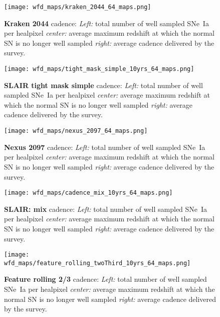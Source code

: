 \begin{figure}[!htbp]
  \begin{center}
    \texttt{[image: wfd\_maps/kraken\_2044\_64\_maps.png]}
    \caption{{\bf Kraken 2044} cadence: {\em Left:} total number of well
      sampled SNe~Ia per healpixel {\em center:} average maximum
      redshift at which the normal SN is no longer well sampled {\em
        right:} average cadence delivered by the survey.}
    \label{fig:kraken_2044}
  \end{center}
\end{figure}

\begin{figure}[!htbp]
  \begin{center}
    \texttt{[image: wfd\_maps/tight\_mask\_simple\_10yrs\_64\_maps.png]}
    \caption{{\bf SLAIR tight mask simple} cadence: {\em Left:} total number of well
      sampled SNe~Ia per healpixel {\em center:} average maximum
      redshift at which the normal SN is no longer well sampled {\em
        right:} average cadence delivered by the survey.}
    \label{fig:tight_mask_simple}
  \end{center}
\end{figure}

\begin{figure}[!htbp]
  \begin{center}
    \texttt{[image: wfd\_maps/nexus\_2097\_64\_maps.png]}
    \caption{{\bf Nexus 2097} cadence: {\em Left:} total number of well
      sampled SNe~Ia per healpixel {\em center:} average maximum
      redshift at which the normal SN is no longer well sampled {\em
        right:} average cadence delivered by the survey.}
    \label{fig:nexus_2097}
  \end{center}
\end{figure}

\begin{figure}[!htbp]
  \begin{center}
    \texttt{[image: wfd\_maps/cadence\_mix\_10yrs\_64\_maps.png]}
    \caption{{\bf SLAIR: mix} cadence: {\em Left:} total number of well
      sampled SNe~Ia per healpixel {\em center:} average maximum
      redshift at which the normal SN is no longer well sampled {\em
        right:} average cadence delivered by the survey.}
    \label{fig:cadence_mix}
  \end{center}
\end{figure}

\begin{figure}[!htbp]
  \begin{center}
    \texttt{[image: wfd\_maps/feature\_rolling\_twoThird\_10yrs\_64\_maps.png]}
    \caption{{\bf Feature rolling 2/3} cadence: {\em Left:} total number of well
      sampled SNe~Ia per healpixel {\em center:} average maximum
      redshift at which the normal SN is no longer well sampled {\em
        right:} average cadence delivered by the survey.}
    \label{fig:feature_rolling_two_third}
  \end{center}
\end{figure}

